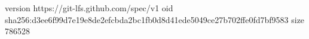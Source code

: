 version https://git-lfs.github.com/spec/v1
oid sha256:d3ee6f99d7e19e8de2efcbda2bc1fb0d8d41ede5049ce27b702ffe0fd7bf9583
size 786528
